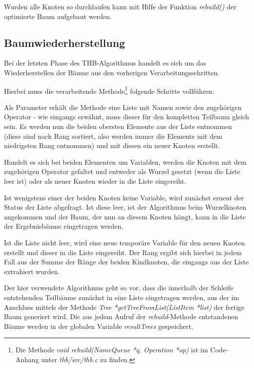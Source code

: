 Wurden alle Knoten so durchlaufen kann mit Hilfe der Funktion \textit{rebuild()} der optimierte Baum aufgebaut werden.

\subsection{Baumwiederherstellung}

Bei der letzten Phase des \ac{THB}-Algorithmus handelt es sich um das Wiederherstellen der Bäume aus den vorherigen Verarbeitungsschritten.

Hierbei muss die verarbeitende Methode\footnote{Die Methode \textit{void rebuild(NameQueue *q, Operation *op)} ist im Code-Anhang unter \textit{thb/src/thb.c} zu finden.} folgende Schritte vollführen:

Als Parameter erhält die Methode eine Liste mit Namen sowie den zugehörigen Operator - wie eingangs erwähnt, muss dieser für den kompletten Teilbaum gleich sein. Es werden nun die beiden obersten Elemente aus der Liste entnommen (diese sind nach Rang sortiert, also werden immer die Elemente mit dem niedrigsten Rang entnommen) und mit diesen ein neuer Knoten erstellt.

Handelt es sich bei beiden Elementen um Variablen, werden die Knoten mit dem zugehörigen Operator gefaltet und entweder als Wurzel gesetzt (wenn die Liste leer ist) oder als neuer Knoten wieder in die Liste eingereiht.

Ist wenigstens einer der beiden Knoten keine Variable, wird zunächst erneut der Status der Liste abgefragt. Ist diese leer, ist der Algorithmus beim Wurzelknoten angekommen und der Baum, der nun an diesem Knoten hängt, kann in die Liste der Ergebnisbäume eingetragen werden.

Ist die Liste nicht leer, wird eine neue temporäre Variable für den neuen Knoten erstellt und dieser in die Liste eingereiht. Der Rang ergibt sich hierbei in jedem Fall aus der Summe der Ränge der beiden Kindknoten, die eingangs aus der Liste extrahiert wurden.

Der hier verwendete Algorithmus geht so vor, dass die innerhalb der Schleife entstehenden Teilbäume zunächst in eine Liste eingetragen werden, aus der im Anschluss mittels der Methode \textit{Tree *getTreeFromList(ListItem *list)} der fertige Baum generiert wird. Die aus jedem Aufruf der \textit{rebuild}-Methode entstandenen Bäume werden in der globalen Variable \textit{resultTrees} gespeichert.
